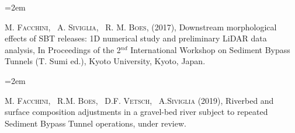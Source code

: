 \documentclass{scrartcl}
\newcommand{\MarginText}[1]{\marginpar{\raggedleft\itshape\small#1}} %
\newcommand{\Description}[1]{\hangindent=2em\hangafter=0\noindent\raggedright\footnotesize{#1}\par\normalsize\vspace{1em}} %
\begin{document}
\begin{cv}{}
\Description{\MarginText{3}
	M. \textsc{Facchini}, ~A. \textsc{Siviglia}, ~R. M. \textsc{Boes}, (2017), Downstream morphological effects of SBT releases: 1D numerical study and preliminary LiDAR data analysis, In Proceedings of the 2$^{nd}$ International Workshop on Sediment Bypass Tunnels (T. Sumi ed.), Kyoto University, Kyoto, Japan.}


\Description{\MarginText{4}
	M. \textsc{Facchini}, ~R.M. \textsc{Boes}, ~D.F. \textsc{Vetsch}, ~A.\textsc{Siviglia} (2019), Riverbed and surface composition adjustments in a gravel-bed river subject to repeated Sediment Bypass Tunnel operations, under review.}


\vspace{1em} %

%
%
%
%
%
%
%
%
%


\end{cv}
\end{document}

